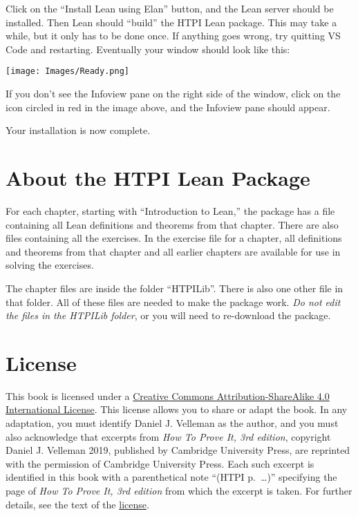 \documentclass[
  letterpaper,
  DIV=11,
  numbers=noendperiod]{scrreprt}
\theoremstyle{remark}
\begin{document}
Click on the ``Install Lean using Elan'' button, and the Lean server
should be installed. Then Lean should ``build'' the HTPI Lean package.
This may take a while, but it only has to be done once. If anything goes
wrong, try quitting VS Code and restarting. Eventually your window
should look like this:

\texttt{[image: Images/Ready.png]}

If you don't see the Infoview pane on the right side of the window,
click on the icon circled in red in the image above, and the Infoview
pane should appear.

Your installation is now complete.

\hypertarget{about-the-htpi-lean-package}{%
\section*{About the HTPI Lean
Package}\label{about-the-htpi-lean-package}}


For each chapter, starting with ``Introduction to Lean,'' the package
has a file containing all Lean definitions and theorems from that
chapter. There are also files containing all the exercises. In the
exercise file for a chapter, all definitions and theorems from that
chapter and all earlier chapters are available for use in solving the
exercises.

The chapter files are inside the folder ``HTPILib''. There is also one
other file in that folder. All of these files are needed to make the
package work. \emph{Do not edit the files in the HTPILib folder}, or you
will need to re-download the package.

\hypertarget{license}{%
\section*{License}\label{license}}


This book is licensed under a
\href{http://creativecommons.org/licenses/by-sa/4.0/}{Creative Commons
Attribution-ShareAlike 4.0 International License}. This license allows
you to share or adapt the book. In any adaptation, you must identify
Daniel J. Velleman as the author, and you must also acknowledge that
excerpts from \emph{How To Prove It, 3rd edition}, copyright Daniel J.
Velleman 2019, published by Cambridge University Press, are reprinted
with the permission of Cambridge University Press. Each such excerpt is
identified in this book with a parenthetical note ``(HTPI p.~\ldots)''
specifying the page of \emph{How To Prove It, 3rd edition} from which
the excerpt is taken. For further details, see the text of the
\href{https://creativecommons.org/licenses/by-sa/4.0/legalcode}{license}.
\end{document}
